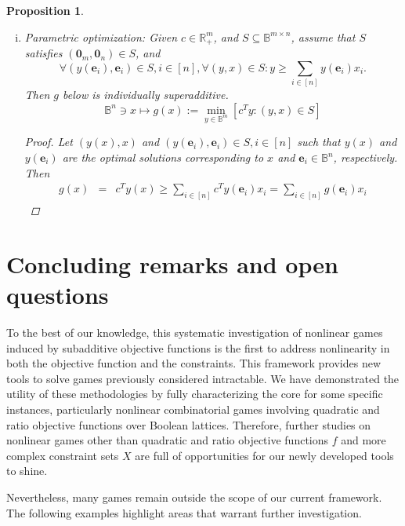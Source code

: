 \documentclass[11pt]{article}\usepackage[]{graphicx}\usepackage[]{xcolor}
\newtheorem{prop}{Proposition}
\begin{document}
\begin{prop}
\begin{enumerate}[(i)]
\begin{enumerate}[(i)]
\end{enumerate}



\item Parametric optimization: Given $c\in \mathbb{R}^{m}_{+}$, and $S\subseteq \mathbb{B}^{m\times n}$, assume that $S$ satisfies $\left(\mathbf{0}_m, \mathbf{0}_n\right)\in S$, and 
\[
\forall \left(y(\mathbf{e}_i), \mathbf{e}_i\right)\in S, i\in [n], \forall (y, x)\in S: y\ge \sum_{i\in [n]} y(\mathbf{e}_i)x_i. 
\]
Then $g$ below is individually superadditive. 
\[
\mathbb{B}^n\ni x\mapsto g(x):=\min_{y\in\mathbb{B}^m}[c^Ty: (y, x)\in S]
\]
\begin{proof}
Let $(y(x), x)$ and $\left(y\left(\mathbf{e}_i\right), \mathbf{e}_i\right)\in S, i\in [n]$ such that $y(x)$ and $y\left(\mathbf{e}_i\right)$ are the optimal solutions corresponding to $x$ and $\mathbf{e}_i\in \mathbb{B}^n$, respectively. Then 
\begin{eqnarray*}
g(x)&=&c^Ty(x)\ge \sum_{i\in [n]} c^Ty\left(\mathbf{e}_i\right)x_i=\sum_{i\in [n]}g\left(\mathbf{e}_i\right)x_i
\end{eqnarray*}
\end{proof}

\end{enumerate}
\end{prop}



\section{Concluding remarks and open questions}\label{sec:conclusion}

To the best of our knowledge, this systematic investigation of nonlinear games induced by subadditive objective functions is the first to address nonlinearity in both the objective function and the constraints. This framework provides new tools to solve games previously considered intractable. We have demonstrated the utility of these methodologies by fully characterizing the core for some specific instances, particularly nonlinear combinatorial games involving quadratic and ratio objective functions over Boolean lattices. Therefore, further studies on nonlinear games other than quadratic and ratio objective functions $f$ and more complex constraint sets $X$ are full of opportunities for our newly developed tools to shine. 

Nevertheless, many games remain outside the scope of our current framework. The following examples highlight areas that warrant further investigation.
\end{document}
